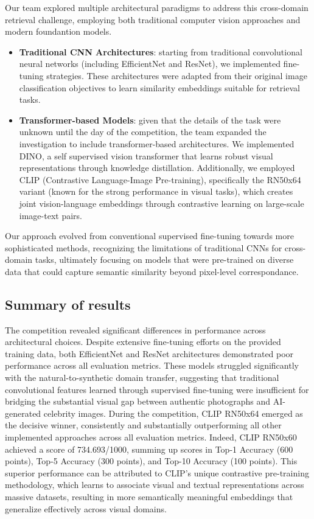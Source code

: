 Our team explored multiple architectural paradigms to address this cross-domain retrieval challenge, employing both traditional computer vision approaches and modern foundantion models.
\begin{itemize}
\item {\bf Traditional CNN Architectures}: starting from traditional convolutional neural networks (including EfficientNet and ResNet), we implemented fine-tuning strategies.
These architectures were adapted from their original image classification objectives to learn similarity embeddings suitable for retrieval tasks. 
\item {\bf Transformer-based Models}: given that the details of the task were unknown until the day of the competition, the team expanded the investigation to include transformer-based architectures. 
We implemented DINO, a self supervised vision transformer that learns robust visual representations through knowledge distillation. 
Additionally, we employed CLIP (Contrastive Language-Image Pre-training), specifically the RN50x64 variant (known for the strong performance in visual tasks), which creates joint vision-language embeddings through contrastive learning on large-scale image-text pairs. 
\end{itemize}
Our approach evolved from conventional supervised fine-tuning towards more sophisticated methods, recognizing the limitations of traditional CNNs for cross-domain tasks, ultimately focusing on models that were pre-trained on diverse data that could capture semantic similarity beyond pixel-level correspondance. 

\subsection{Summary of results }
The competition revealed significant differences in performance across architectural choices. 
Despite extensive fine-tuning efforts on the provided training data, both EfficientNet and ResNet architectures demonstrated poor performance across all evaluation metrics. 
These models struggled significantly with the natural-to-synthetic domain transfer, suggesting that traditional convolutional features learned through supervised fine-tuning were insufficient for bridging the substantial visual gap between authentic photographs and AI-generated celebrity images.
During the competition, CLIP RN50x64 emerged as the decisive winner, consistently and substantially outperforming all other implemented approaches across all evaluation metrics. 
Indeed, CLIP RN50x60 achieved a score of 734.693/1000, summing up scores in Top-1 Accuracy (600 points), Top-5 Accuracy (300 points), and Top-10 Accuracy (100 points).
This superior performance can be attributed to CLIP's unique contrastive pre-training methodology, which learns to associate visual and textual representations across massive datasets, resulting in more semantically meaningful embeddings that generalize effectively across visual domains.



